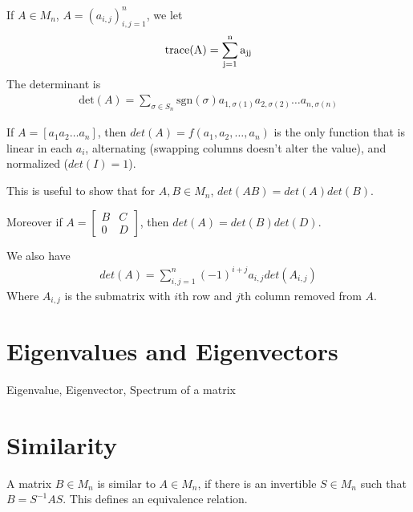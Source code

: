 

\begin{definition}
  If $A \in M_n$, $A = (a_{i, j})_{i, j = 1}^n$, we let
  \begin{align*}
    \rm{trace}(A) = \sum_{j = 1}^{n} a_{jj}
  \end{align*}
  The determinant is
  \begin{align*}
    \textrm{det}(A) = \sum_{ \sigma \in  S_n} \textrm{sgn}(\sigma)
    a_{1, \sigma(1)} a_{2, \sigma(2)} \ldots a_{n, \sigma(n)}
  \end{align*}
\end{definition}

\begin{remark}
  If $A = [a_1  a_2  \ldots  a_n]$, then $det(A) = f( a_1 , a_2 ,
  \ldots , a_n)$ is the only function that is linear in each $a_i$,
  alternating (swapping columns doesn't alter the value), and
  normalized ($det(I) = 1$).

  This is useful to show that for $A, B \in M_n$, $det(AB) = det(A) det(B)$.

  Moreover if $A =
  \begin{bmatrix}
    B & C \\
    0 & D
  \end{bmatrix}$, then $det(A) = det(B) det(D)$.

  We also have
  \begin{align*}
    det(A) = \sum_{i, j = 1}^{n} (-1)^{i + j} a_{i, j} det(A_{i, j})
  \end{align*}
  Where $A_{i, j}$ is the submatrix with $i$th row and $j$th column
  removed from $A$.
\end{remark}

\section{Eigenvalues and Eigenvectors}

\begin{definition}
  Eigenvalue, Eigenvector, Spectrum of a matrix
\end{definition}

\section{Similarity}

\begin{definition}
  A matrix $B \in M_n$ is similar to $A \in M_n$, if there is an
  invertible $S \in M_n$ such that $B = S^{-1}AS$. This defines an
  equivalence relation.
\end{definition}

